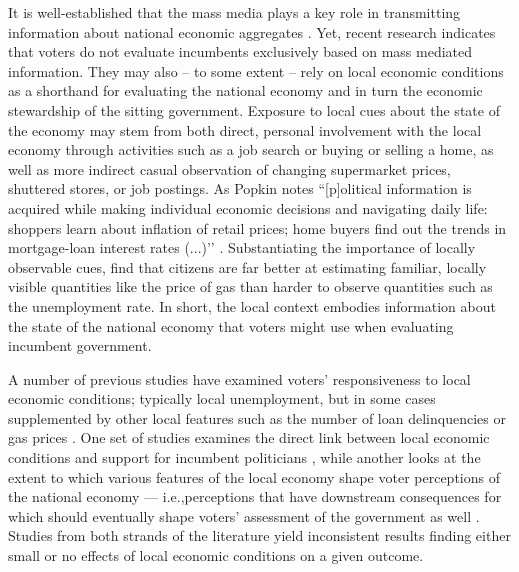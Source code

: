 \documentclass[12pt,a4paper]{article}
\begin{document}
	It is well-established that the mass media plays a key role in transmitting information about national economic aggregates \citep[e.g.,][]{soroka2015s}. Yet, recent research indicates that voters do not evaluate incumbents exclusively based on mass mediated information. They may also – to some extent -- rely on local economic conditions as a shorthand for evaluating the national economy \citep{bisgaard2016reconsidering, reeves2012ecologies} and in turn the economic stewardship of the sitting government. Exposure to local cues about the state of the economy may stem from both direct, personal involvement with the local economy through activities such as a job search or buying or selling a home, as well as more indirect casual observation of changing supermarket prices, shuttered stores, or job postings. As Popkin \citeyearpar[][p. 24]{popkin1994reasoning} notes ``[p]olitical information is acquired while making individual economic decisions and navigating daily life: shoppers learn about inflation of retail prices; home buyers find out the trends in mortgage-loan interest rates (...)’’ \cite[see also][p. 5]{fiorina1981retrospective}. Substantiating the importance of locally observable cues, \cite{ansolabehere2012asking} find that citizens are far better at estimating familiar, locally visible quantities like the price of gas than harder to observe quantities such as the unemployment rate. In short, the local context embodies information about the state of the national economy that voters might use when evaluating incumbent government. 
	
	A number of previous studies have examined voters’ responsiveness to local economic conditions; typically local unemployment, but in some cases supplemented by other local features such as the number of loan delinquencies \citep{healy2017presidential} or gas prices \citep{reeves2012ecologies}. One set of studies examines the direct link between local economic conditions and support for incumbent politicians \citep{hansford2015reevaluating,eisenberg2004economic,kim2003spatial,healy2017presidential, auberger2005influence,wright2012unemployment,hill2010economic,elinder2010local,johnston2001s,veiga2010impact}, while another looks at the extent to which various features of the local economy shape voter perceptions of the national economy — i.e.,perceptions that have downstream consequences for which should eventually shape voters’ assessment of the government as well  \citep{books1999contextual, reeves2012ecologies,anderson2011local,ansolabehere2014mecro}. Studies from both strands of the literature yield inconsistent results finding either small or no effects of local economic conditions on a given outcome.   
	
\end{document}
